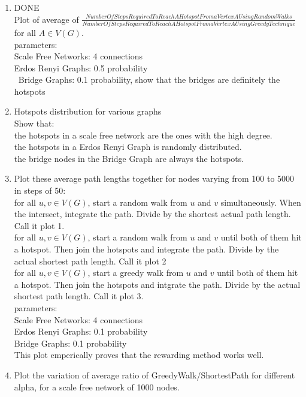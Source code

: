 \documentclass{article}
\begin{document}
\begin{enumerate}
\item
DONE\\
Plot of average of $\frac{Number Of Steps Required To Reach A Hotspot From a Vertex A Using Random Walks}{Number Of Steps Required To Reach A Hotspot From a Vertex A Using Greedy Technique}$ for all $A \in V(G)$.\\
parameters:\\
Scale Free Networks: 4 connections\\
Erdos Renyi Graphs: 0.5 probability\\\
Bridge Graphs: 0.1 probability, show that the bridges are definitely the hotspots\\

\item Hotspots distribution for various graphs\\
Show that:\\
the hotspots in a scale free network are the ones with the high degree.\\
the hotspots in a Erdos Renyi Graph is randomly distributed.\\
the bridge nodes in the Bridge Graph are always the hotspots.\\

\item Plot these average path lengths together for nodes varying from 100 to 5000 in steps of 50:\\
for all $u,v \in V(G)$, start a random walk from $u$ and $v$ simultaneously. When the intersect, integrate the path. Divide by the shortest actual path length. Call it plot 1.\\
for all $u,v \in V(G)$, start a random walk from $u$ and $v$ until both of them hit a hotspot. Then join the hotspots and integrate the path. Divide by the actual shortest path length. Call it plot 2\\
for all $u,v \in V(G)$, start a greedy walk from $u$ and $v$ until both of them hit a hotspot. Then join the hotspots and intgrate the path. Divide by the actual shortest path length. Call it plot 3. \\
parameters:\\
Scale Free Networks: 4 connections\\
Erdos Renyi Graphs: 0.1 probability\\
Bridge Graphs: 0.1 probability\\
This plot emperically proves that the rewarding method works well.

\item Plot the variation of average ratio of GreedyWalk/ShortestPath for different alpha, for a scale free network of 1000 nodes.
\end{enumerate}
\end{document}
